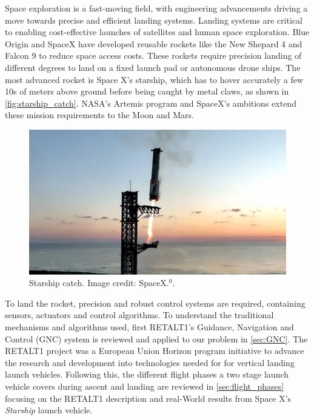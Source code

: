 Space exploration is a fast-moving field, with engineering advancements driving a move towards precise and efficient landing systems. Landing systems are critical to enabling cost-effective launches of satellites and human space exploration. Blue Origin and SpaceX have developed reusable rockets like the New Shepard 4 and Falcon 9 to reduce space access costs. These rockets require precision landing of different degrees to land on a fixed launch pad or autonomous drone ships. The most advanced rocket is Space X's starship, which has to hover accurately a few 10s of meters above ground before being caught by metal claws, as shown in \autoref{fig:starship_catch}. NASA's Artemis program and SpaceX's ambitions extend these mission requirements to the Moon and Mars.

\begin{figure}[H]
    \centering
    \includegraphics[width=0.95\linewidth]{figures/LiteratureStudy/StarshipCatch.jpg}
    \caption{Starship catch. Image credit: SpaceX.$^{0}$.\label{fig:starship_catch}}
\end{figure}

To land the rocket, precision and robust control systems are required, containing sensors, actuators and control algorithms. To understand the traditional mechanisms and algorithms used, first RETALT1's Guidance, Navigation and Control (GNC) system is reviewed and applied to our problem in \autoref{sec:GNC}. The RETALT1 project was a European Union Horizon program initiative to advance the research and development into technologies needed for for vertical landing launch vehicles. Following this, the different flight phases a two stage launch vehicle covers during ascent and landing are reviewed in \autoref{sec:flight_phases} focusing on the RETALT1 description and real-World results from Space X's \textit{Starship} launch vehicle.

